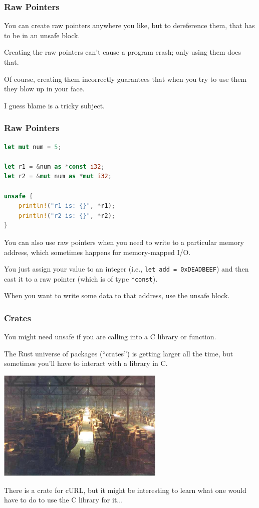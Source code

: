 \begin{frame}
\frametitle{Raw Pointers}

You can create raw pointers anywhere you like, but to dereference them, that has to be in an unsafe block. 

Creating the raw pointers can't cause a program crash; only using them does that.

Of course, creating them incorrectly guarantees that when you try to use them they blow up in your face. 

I guess blame is a tricky subject.

\end{frame}


\begin{frame}[fragile]
\frametitle{Raw Pointers}

\begin{lstlisting}[language=Rust]
let mut num = 5;

let r1 = &num as *const i32;
let r2 = &mut num as *mut i32;

unsafe {
    println!("r1 is: {}", *r1);
    println!("r2 is: {}", *r2);
}
\end{lstlisting}

You can also use raw pointers when you need to write to a particular memory address, which sometimes happens for memory-mapped I/O. 

You just assign your value to an integer (i.e., \texttt{let add = 0xDEADBEEF}) and then cast it to a raw pointer (which is of type \texttt{*const}). 

When you want to write some data to that address, use the unsafe block.

\end{frame}

\begin{frame}
\frametitle{Crates}

You might need unsafe if you are calling into a C library or function.

The Rust universe of packages (``crates'') is getting larger all the time, but sometimes you'll have to interact with a library in C.

\begin{center}
	\includegraphics[width=0.6\textwidth]{images/indy-warehouse.jpg}
\end{center}

There is a crate for cURL, but it might be interesting to learn what one would have to do to use the C library for it...

\end{frame}





